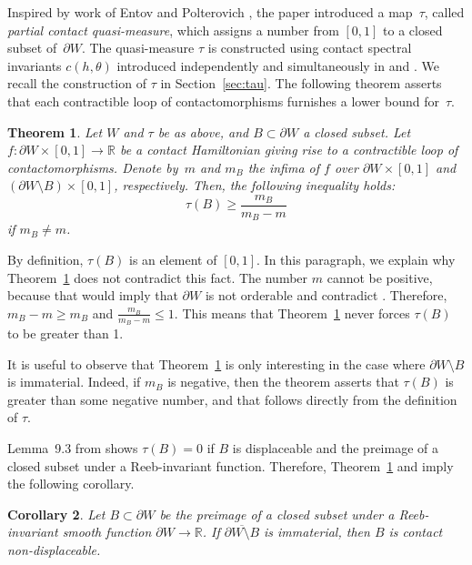 \documentclass[10pt,a4paper]{amsart}
\numberwithin{equation}{section}
\newtheorem{Theorem}{Theorem}
\newtheorem{Corollary}[Theorem]{Corollary}
\theoremstyle{definition}
\begin{document}
Inspired by work of Entov and Polterovich \cite{Ent14, EP06,EP08,EP-rigidity}, the paper \cite{djordjevic2025quantitative} introduced {a map~$\tau$, called \emph{partial contact quasi-measure},} which assigns a number from $[0,1]$ to a closed subset of~$\partial W$. The quasi-measure $\tau$ is constructed using contact spectral invariants $c(h, \theta)$ introduced independently and simultaneously in \cite{cant2023shelukhin} and \cite{djordjevic2023quantitative}. We recall the construction of $\tau$ in Section~\ref{sec:tau}. The following theorem asserts that each contractible loop of contactomorphisms furnishes a lower bound for~$\tau$.

\begin{Theorem}\label{thm:tau}
Let $W$ and $\tau$ be as above, and $B\subset \partial W$ a closed subset. Let $f\colon\partial W\times [0,1]\to\mathbb{R}$ be a contact Hamiltonian giving rise to a contractible loop of contactomorphisms. Denote {by}~$m$ and $m_B$ the infima of $f$ over $\partial W\times[0,1]$ and $(\partial W\setminus B)\times[0,1]$, respectively. Then, the following inequality holds:
\[\tau(B)\geqslant \frac{m_B}{m_B-m}\]
if $m_B\not=m$.
\end{Theorem}

{By definition, $\tau(B)$ is an element of $[0,1]$. In this paragraph, we explain why Theorem~\ref{thm:tau} does not contradict this fact. The number $m$ cannot be positive, because that would imply that $\partial W$ is not orderable and contradict \cite[Theorem~1.6]{djordjevic2025quantitative}. Therefore, $m_B-m\geqslant m_B$ and $\frac{m_B}{m_B-m}\leqslant 1$. This means that Theorem~\ref{thm:tau} never forces $\tau(B)$ to be greater than 1.

It is useful to observe that Theorem~\ref{thm:tau} is only interesting in the case where $\partial W\setminus B$ is immaterial. Indeed, if $m_B$ is negative, then the theorem asserts that $\tau(B)$ is greater than some negative number, and that follows directly from the definition of $\tau$.}
Lemma~9.3 from \cite{djordjevic2025quantitative} shows $\tau(B)=0$ if $B$ is displaceable and the preimage of a closed subset under a Reeb-invariant function. Therefore, Theorem~\ref{thm:tau} and \cite[Lemma~9.3]{djordjevic2025quantitative} imply the following corollary.


\begin{Corollary}\label{cor:nondisp}
Let $B\subset\partial W$ be the preimage of a closed subset under a Reeb-invariant smooth function {$\partial W\to\mathbb{R}$}. If $\overline{\partial W \setminus B}$ is immaterial, then $B$ is contact non-displaceable.
\end{Corollary}
\end{document}
